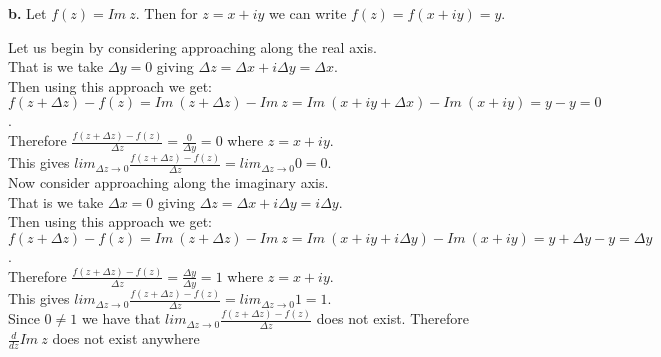 \documentclass{article}
\begin{document}
{\Large\textbf{b.}} Let $f(z) = Im\:z$. Then for $z = x + iy$ we can write $f(z) = f(x + iy) = y$.
\begin{center}
    \doublespacing
    Let us begin by considering approaching along the real axis.
    \\That is we take $\Delta y = 0$ giving $\Delta z = \Delta x + i\Delta y =\Delta x$.
    \\Then using this approach we get:
    \\$f(z +\Delta z) - f(z) = Im\:(z +\Delta z) - Im\:z = Im\:(x + iy +\Delta x) - Im\:(x + iy) = y - y = 0$.
    \\Therefore $\frac{f(z +\Delta z) - f(z)}{\Delta z} =\frac{0}{\Delta y} = 0$ where $z = x + iy$.
    \\This gives $lim _{\Delta z\rightarrow 0}\frac{f(z +\Delta z) - f(z)}{\Delta z} = lim _{\Delta z\rightarrow 0} 0 = 0$.
    \break
    \\Now consider approaching along the imaginary axis.
    \\That is we take $\Delta x = 0$ giving $\Delta z = \Delta x + i\Delta y = i\Delta y$.
    \\Then using this approach we get:
    \\$f(z +\Delta z) - f(z) = Im\:(z +\Delta z) - Im\:z = Im\:(x + iy + i\Delta y) - Im\:(x + iy) = y +\Delta y - y =\Delta y$.
    \\Therefore $\frac{f(z +\Delta z) - f(z)}{\Delta z} =\frac{\Delta y}{\Delta y} = 1$ where $z = x + iy$.
    \\This gives $lim _{\Delta z\rightarrow 0}\frac{f(z +\Delta z) - f(z)}{\Delta z} = lim _{\Delta z\rightarrow 0} 1 = 1$.
    \break
    \\Since $0\neq 1$ we have that $lim _{\Delta z\rightarrow 0}\frac{f(z +\Delta z) - f(z)}{\Delta z}$ does not exist. Therefore $\frac{d}{dz} Im\:z$ does not exist anywhere \qedsymbol
\end{center}


\newpage
\end{document}
